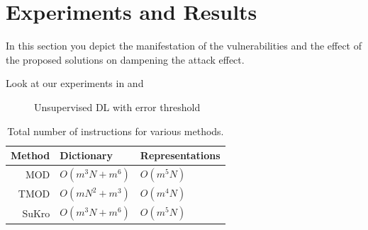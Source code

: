 \section{Experiments and Results}

In this section you depict the manifestation of the vulnerabilities and the effect of the proposed solutions on dampening the attack effect.

Look at our experiments in 
and
\begin{figure}[ht]
\centering
\caption{Unsupervised DL with error threshold}
\label{fig:experiment1}
\end{figure}

\begin{table}[ht]
\begin{center}
\begin{tabular}{r l l}

Method & Dictionary & Representations \\
\hline
MOD & $O(m^3N+m^6)$ & $O(m^5N)$ \\
TMOD & $O(mN^2 + m^3)$ & $O(m^4N)$ \\
SuKro & $O(m^3N+m^6)$ & $O(m^5N)$ \\
\end{tabular}
\end{center}
\caption{Total number of instructions for various methods.}
\label{tab:experiment2}
\end{table}